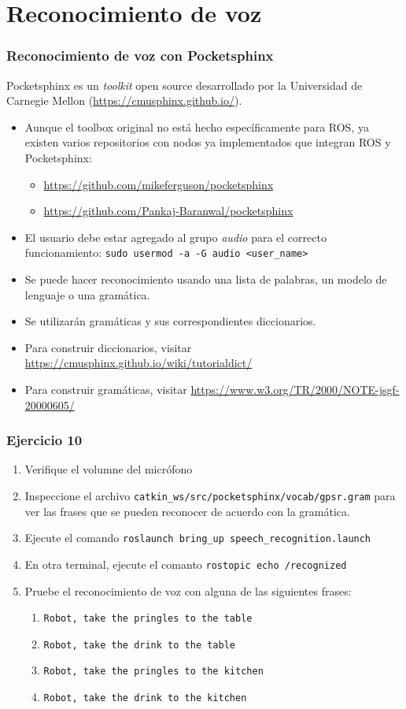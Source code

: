 \section{Reconocimiento de voz}
\begin{frame}\frametitle{Reconocimiento de voz con Pocketsphinx}
  Pocketsphinx es un \textit{toolkit} open source desarrollado por la Universidad de Carnegie Mellon (\url{https://cmusphinx.github.io/}).
  \begin{itemize}
  \item Aunque el toolbox original no está hecho específicamente para ROS, ya existen varios repositorios con nodos ya implementados que integran ROS y Pocketsphinx:
    \begin{itemize}
    \item \url{https://github.com/mikeferguson/pocketsphinx}
    \item \url{https://github.com/Pankaj-Baranwal/pocketsphinx}
    \end{itemize}
  \item El usuario debe estar agregado al grupo \textit{audio} para el correcto funcionamiento: \texttt{sudo usermod -a -G audio <user\_name>}
  \end{itemize}
  \begin{itemize}
  \item Se puede hacer reconocimiento usando una lista de palabras, un modelo de lenguaje o una gramática.
  \item Se utilizarán gramáticas y sus correspondientes diccionarios.
  \item Para construir diccionarios, visitar \url{https://cmusphinx.github.io/wiki/tutorialdict/}
  \item Para construir gramáticas, visitar \url{https://www.w3.org/TR/2000/NOTE-jsgf-20000605/}
  \end{itemize}
\end{frame}

\begin{frame}\frametitle{Ejercicio 10}
  \begin{enumerate}
  \item Verifique el volumne del micrófono
  \item Inspeccione el archivo \texttt{catkin\_ws/src/pocketsphinx/vocab/gpsr.gram} para ver las frases que se pueden reconocer de acuerdo con la gramática.
  \item Ejecute el comando \texttt{roslaunch bring\_up speech\_recognition.launch}
  \item En otra terminal, ejecute el comanto \texttt{rostopic echo /recognized}
  \item Pruebe el reconocimiento de voz con alguna de las siguientes frases:
    \begin{enumerate}
    \item \texttt{Robot, take the pringles to the table}
    \item \texttt{Robot, take the drink to the table}
    \item \texttt{Robot, take the pringles to the kitchen}
    \item \texttt{Robot, take the drink to the kitchen}
    \end{enumerate}
  \end{enumerate}
\end{frame}
